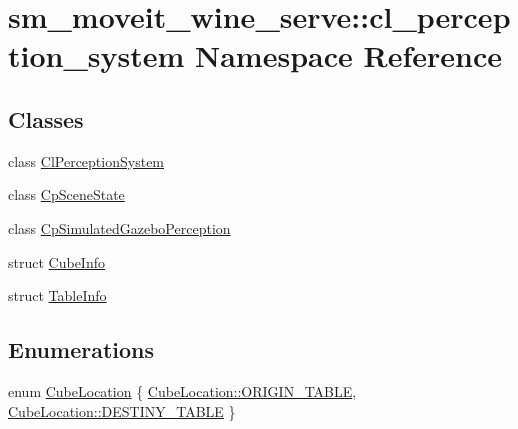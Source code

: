 \hypertarget{namespacesm__moveit__wine__serve_1_1cl__perception__system}{}\section{sm\+\_\+moveit\+\_\+wine\+\_\+serve\+:\+:cl\+\_\+perception\+\_\+system Namespace Reference}
\label{namespacesm__moveit__wine__serve_1_1cl__perception__system}
\subsection*{Classes}
\begin{DoxyCompactItemize}
\item 
class \hyperlink{classsm__moveit__wine__serve_1_1cl__perception__system_1_1ClPerceptionSystem}{Cl\+Perception\+System}
\item 
class \hyperlink{classsm__moveit__wine__serve_1_1cl__perception__system_1_1CpSceneState}{Cp\+Scene\+State}
\item 
class \hyperlink{classsm__moveit__wine__serve_1_1cl__perception__system_1_1CpSimulatedGazeboPerception}{Cp\+Simulated\+Gazebo\+Perception}
\item 
struct \hyperlink{structsm__moveit__wine__serve_1_1cl__perception__system_1_1CubeInfo}{Cube\+Info}
\item 
struct \hyperlink{structsm__moveit__wine__serve_1_1cl__perception__system_1_1TableInfo}{Table\+Info}
\end{DoxyCompactItemize}
\subsection*{Enumerations}
\begin{DoxyCompactItemize}
\item 
enum \hyperlink{namespacesm__moveit__wine__serve_1_1cl__perception__system_abb5953d380907809caaf4c1a83eec32c}{Cube\+Location} \{ \hyperlink{namespacesm__moveit__wine__serve_1_1cl__perception__system_abb5953d380907809caaf4c1a83eec32cae5ee34c3ef8ec4a46a00a218416c7b1d}{Cube\+Location\+::\+O\+R\+I\+G\+I\+N\+\_\+\+T\+A\+B\+LE}, 
\hyperlink{namespacesm__moveit__wine__serve_1_1cl__perception__system_abb5953d380907809caaf4c1a83eec32cacdc3fdda18904b4a1ac0be036c86f973}{Cube\+Location\+::\+D\+E\+S\+T\+I\+N\+Y\+\_\+\+T\+A\+B\+LE}
 \}
\end{DoxyCompactItemize}


